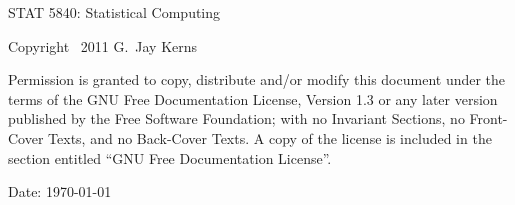 \setcounter{page}{2}

\noindent STAT 5840: Statistical Computing

\noindent Copyright \textcopyright~2011 G.~Jay Kerns

\medskip{}


\noindent Permission is granted to copy, distribute and/or modify
this document under the terms of the GNU Free Documentation License,
Version 1.3 or any later version published by the Free Software Foundation;
with no Invariant Sections, no Front-Cover Texts, and no Back-Cover
Texts. A copy of the license is included in the section entitled ``GNU
Free Documentation License''.

\bigskip

\noindent Date: \today
\noindent \vfill{}

\newpage
{}
{}

\tableofcontents{}


